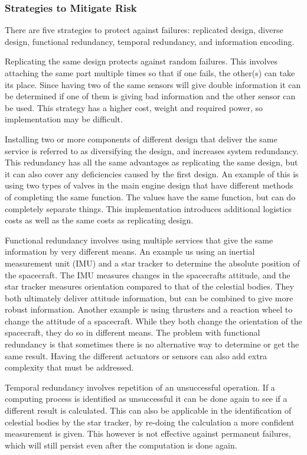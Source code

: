 \documentclass[paper=letter, fontsize=11pt]{scrartcl} %
\numberwithin{equation}{section} %
\numberwithin{figure}{section} %
\numberwithin{table}{section} %
\begin{document}
\subsubsection{Strategies to Mitigate Risk}
There are five strategies to protect against failures: replicated design, diverse design, functional redundancy, temporal redundancy, and information encoding.

Replicating the same design protects against random failures. This involves attaching the same part multiple times so that if one fails, the other(s) can take its place. Since having two of the same sensors will give double information it can be determined if one of them is giving bad information and the other sensor can be used. This strategy has a higher cost, weight and required power, so implementation may be difficult.

Installing two or more components of different design that deliver the same service is referred to as diversifying the design, and increases system redundancy. This redundancy has all the same advantages as replicating the same design, but it can also cover any deficiencies caused by the first design. An example of this is using two types of valves in the main engine design that have different methods of completing the same function. The values have the same function, but can do completely separate things. This implementation introduces additional logistics costs as well as the same costs as replicating design.

Functional redundancy involves using multiple services that give the same information by very different means. An example us using an inertial measurement unit (IMU) and a star tracker to determine the absolute position of the spacecraft. The IMU measures changes in the spacecrafts attitude, and the star tracker measures orientation compared to that of the celestial bodies. They both ultimately deliver attitude information, but can be combined to give more robust information. Another example is using thrusters and a reaction wheel to change the attitude of a spacecraft. While they both change the orientation of the spacecraft, they do so in different means. The problem with functional redundancy is that sometimes there is no alternative way to determine or get the same result. Having the different actuators or sensors can also add extra complexity that must be addressed.

Temporal redundancy involves repetition of an unsuccessful operation. If a computing process is identified as unsuccessful it can be done again to see if a different result is calculated. This can also be applicable in the identification of celestial bodies by the star tracker, by re-doing the calculation a more confident measurement is given. This however is not effective against permanent failures, which will still persist even after the computation is done again.
\end{document}
